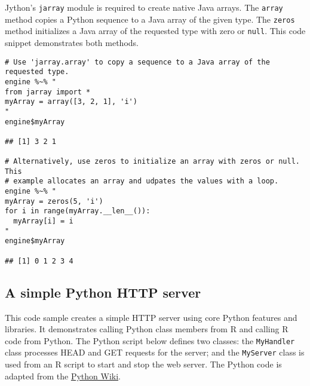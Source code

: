 \documentclass[
article,
11pt, %
a4paper, %
oneside, %
headinclude,footinclude, %
]{scrartcl}
\theoremstyle{definition} %
\theoremstyle{plain} %
\theoremstyle{remark} %
\newcommand{\code}[1]{\texttt{#1}}
\begin{document}
Jython's \code{jarray} module is required to create native Java arrays. The \code{array} method copies a Python sequence to a Java array of the given type. The \code{zeros} method initializes a Java array of the requested type with zero or \code{null}. This code snippet demonstrates both methods.

\begin{verbatim}
# Use 'jarray.array' to copy a sequence to a Java array of the requested type.
engine %~% "
from jarray import *
myArray = array([3, 2, 1], 'i')
"
engine$myArray

## [1] 3 2 1

# Alternatively, use zeros to initialize an array with zeros or null. This
# example allocates an array and udpates the values with a loop.
engine %~% "
myArray = zeros(5, 'i')
for i in range(myArray.__len__()):
  myArray[i] = i
"
engine$myArray

## [1] 0 1 2 3 4
\end{verbatim}

\subsection{A simple Python HTTP server}

This code sample creates a simple HTTP server using core Python features and libraries. It demonstrates calling Python class members from R and calling R code from Python. The Python script below defines two classes: the \code{MyHandler} class processes HEAD and GET requests for the server; and the \code{MyServer} class is used from an R script to start and stop the web server. The Python code is adapted from the \href{https://wiki.python.org/moin/BaseHttpServer}{Python Wiki}.
\end{document}
